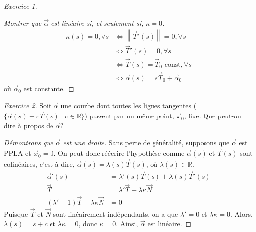 \documentclass{report}
\theoremstyle{definition}
\theoremstyle{remark}
\newtheorem*{exer}{Exercice}
\def\RR{\mathbb{R}}
\newcommand*{\norme}[1]{\left\|#1\right\|}
\begin{document}
	\begin{exer}
		\begin{proof}[Montrer que $\vec\alpha$ est lin\'eaire si, et seulement si, $\kappa=0$]
			\begin{align*}
				\kappa(s)=0, \forall s&\Leftrightarrow \norme{\vec T'(s)}=0, \forall s\\
				&\Leftrightarrow \vec T'(s)=0, \forall s\\
				&\Leftrightarrow \vec T(s)=\vec T_0 \text{ const}, \forall s\\
				&\Leftrightarrow \vec\alpha(s)=s\vec T_0+\vec\alpha_0
			\end{align*} o\`u $\vec\alpha_0$ est constante.
		\end{proof}
	\end{exer}

	\begin{exer}
		Soit $\vec\alpha$ une courbe dont toutes les lignes tangentes ($\{\vec\alpha(s)+c\vec T(s) \mid c \in \RR\}$) passent par un m\^eme point, $\vec x_0$, fixe. Que peut-on dire \`a propos de $\vec\alpha$?
		\begin{proof}[D\'emontrons que $\vec\alpha$ est une droite]
			Sans perte de g\'en\'eralit\'e, supposons que $\vec\alpha$ est PPLA et $\vec x_0=0$. On peut donc r\'e\'ecrire l'hypoth\`ese comme $\vec\alpha(s)$ et $\vec T(s)$ sont colin\'eaires, c'est-\`a-dire, $\vec\alpha(s)=\lambda(s)\vec T(s)$, o\`u $\lambda(s) \in \RR$.
			\begin{align*}
				\vec\alpha'(s)&= \lambda'(s)\vec T(s) + \lambda(s)\vec T'(s)\\
				\vec T&= \lambda'\vec T + \lambda\kappa\vec N\\
				(\lambda'-1)\vec T + \lambda\kappa\vec N&= 0
			\end{align*}
			Puisque $\vec T$ et $\vec N$ sont lin\'eairement ind\'ependants, on a que $\lambda'=0$ et $\lambda\kappa=0$. Alors, $\lambda(s)=s+c$ et $\lambda\kappa=0$, donc $\kappa=0$. Ainsi, $\vec\alpha$ est lin\'eaire.
		\end{proof}
	\end{exer}
\end{document}
